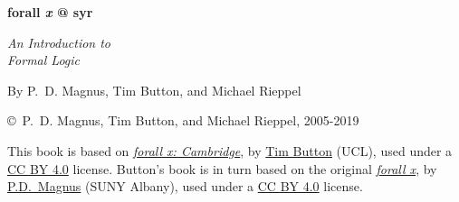 \thispagestyle{empty}


    
\vspace{20pt}
    
\begin{center}
\fontsize{36pt}{36pt}\selectfont
  \textbf{forall \textit{x} @ syr}

\fontsize{24pt}{24pt}\selectfont
\vspace{1em}
\textit{An Introduction to\\ Formal Logic}


\vspace{50pt}

\fontsize{16pt}{18pt}\selectfont By P.~D. Magnus, Tim Button, and Michael Rieppel\\

\end{center}

\newpage


\noindent \small \copyright \ P.~D. Magnus, Tim Button, and Michael Rieppel, 2005-2019

\vspace{1ex}

\noindent This book is based on \href{http://www.homepages.ucl.ac.uk/~uctytbu/forallxcam.pdf}{\emph{forall x: Cambridge}}, by  \href{http://www.homepages.ucl.ac.uk/~uctytbu}{Tim Button}
(UCL), used under a \href{https://creativecommons.org/licenses/by/4.0/}{CC BY 4.0} license.  Button's book is in turn based on the original \href{https://www.fecundity.com/logic/}{\emph{forall x}}, by
\href{https://www.fecundity.com/job/}{P.D.\ Magnus} (SUNY Albany), used under a \href{https://creativecommons.org/licenses/by/4.0/}{CC BY 4.0} license.

